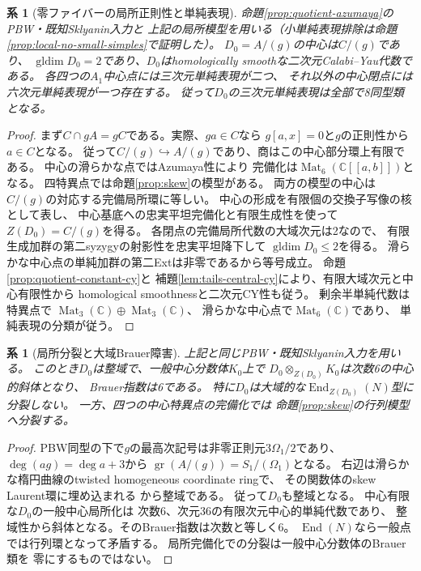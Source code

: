 \documentclass[11pt,a4paper]{ltjsarticle}
\newtheorem{corollary}[theorem]{系}
\newcommand{\CC}{\mathbb C}
\newcommand{\End}{\operatorname{End}}
\newcommand{\Mat}{\operatorname{Mat}}
\newcommand{\gldim}{\operatorname{gldim}}
\begin{document}
\begin{corollary}[零ファイバーの局所正則性と単純表現]\label{cor:zero}
命題\ref{prop:quotient-azumaya}のPBW・既知Sklyanin入力と
上記の局所模型を用いる（小単純表現排除は命題\ref{prop:local-no-small-simples}で証明した）。
$D_0=A/(g)$の中心は$C/(g)$であり、
$\gldim D_0=2$であり、$D_0$はhomologically smoothな二次元Calabi--Yau代数である。
各四つの$A_1$中心点には三次元単純表現が二つ、
それ以外の中心閉点には六次元単純表現が一つ存在する。
従って$D_0$の三次元単純表現は全部で8同型類となる。
\end{corollary}
\begin{proof}
まず$C\cap gA=gC$である。実際、$ga\in C$なら
$g[a,x]=0$と$g$の正則性から$a\in C$となる。
従って$C/(g)\hookrightarrow A/(g)$であり、商はこの中心部分環上有限である。
中心の滑らかな点ではAzumaya性により
完備化は$\Mat_6(\CC[[a,b]])$となる。
四特異点では命題\ref{prop:skew}の模型がある。
両方の模型の中心は$C/(g)$の対応する完備局所環に等しい。
中心の形成を有限個の交換子写像の核として表し、
中心基底への忠実平坦完備化と有限生成性を使って
$Z(D_0)=C/(g)$を得る。
各閉点の完備局所代数の大域次元は2なので、
有限生成加群の第二syzygyの射影性を忠実平坦降下して
$\gldim D_0\le2$を得る。
滑らかな中心点の単純加群の第二Extは非零であるから等号成立。
命題\ref{prop:quotient-constant-cy}と
補題\ref{lem:tails-central-cy}により、有限大域次元と中心有限性から
homological smoothnessと二次元CY性も従う。
剰余半単純代数は特異点で
$\Mat_3(\CC)\oplus\Mat_3(\CC)$、
滑らかな中心点で$\Mat_6(\CC)$であり、
単純表現の分類が従う。
\end{proof}

\begin{corollary}[局所分裂と大域Brauer障害]\label{cor:brauer}
上記と同じPBW・既知Sklyanin入力を用いる。
このとき$D_0$は整域で、一般中心分数体$K_0$上で
$D_0\otimes_{Z(D_0)}K_0$は次数6の中心的斜体となり、
Brauer指数は6である。
特に$D_0$は大域的な$\End_{Z(D_0)}(N)$型に分裂しない。
一方、四つの中心特異点の完備化では
命題\ref{prop:skew}の行列模型へ分裂する。
\end{corollary}
\begin{proof}
PBW同型の下で$g$の最高次記号は非零正則元$3\Omega_1/2$であり、
$\deg(ag)=\deg a+3$から
$\operatorname{gr}(A/(g))=S_1/(\Omega_1)$となる。
右辺は滑らかな楕円曲線のtwisted homogeneous coordinate ringで、
その関数体のskew Laurent環に埋め込まれる
\cite[Lemmas~2.18, 2.19]{WWYSklyanin}から整域である。
従って$D_0$も整域となる。
中心有限な$D_0$の一般中心局所化は
次数6、次元36の有限次元中心的単純代数であり、
整域性から斜体となる。そのBrauer指数は次数と等しく6。
$\End(N)$なら一般点では行列環となって矛盾する。
局所完備化での分裂は一般中心分数体のBrauer類を
零にするものではない。
\end{proof}
\end{document}
